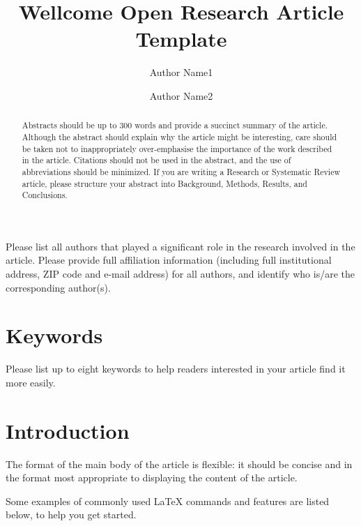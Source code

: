 \documentclass[10pt,a4paper,twocolumn]{article}
\begin{document}
\title{Wellcome Open Research Article Template}
\author[1]{Author Name1}
\author[2]{Author Name2}

\maketitle
\thispagestyle{fancy}

Please list all authors that played a significant role in the research involved in the article. Please provide full affiliation information (including full institutional address, ZIP code and e-mail address) for all authors, and identify who is/are the corresponding author(s).

\begin{abstract}

Abstracts should be up to 300 words and provide a succinct summary of the article. Although the abstract should explain why the article might be interesting, care should be taken not to inappropriately over-emphasise the importance of the work described in the article. Citations should not be used in the abstract, and the use of abbreviations should be minimized. If you are writing a Research or Systematic Review article, please structure your abstract into Background, Methods, Results, and Conclusions.

\end{abstract}

\section*{Keywords}

Please list up to eight keywords to help readers interested in your article find it more easily.


\clearpage


\section*{Introduction}

The format of the main body of the article is flexible: it should be concise and in the format most appropriate to displaying the content of the article.

Some examples of commonly used \LaTeX{}  commands and features are listed below, to help you get started.
\end{document}
